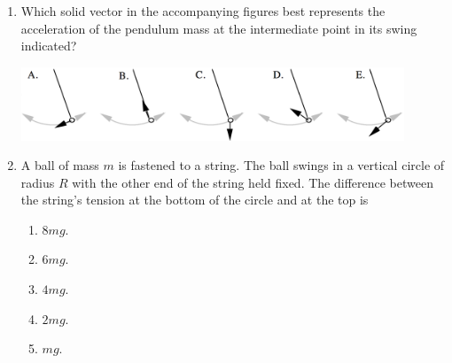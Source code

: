 \documentclass[12pt,letterpaper]{article}
\begin{document}
\begin{enumerate}[resume]
\item
Which solid vector in the accompanying figures best represents the acceleration of the pendulum mass at the intermediate point in its swing indicated?

\includegraphics[width=0.9\textwidth,center]{swing.png}


\item
A ball of mass $m$ is fastened to a string. The ball swings in a vertical circle of radius $R$ with the other end of the string held fixed. The difference between the string's tension at the bottom of the circle and at the top is
\begin{enumerate}
\item $8mg$.
\item $6mg$.
\item $4mg$.
\item $2mg$.
\item $mg$.
\end{enumerate}


\end{enumerate}
\end{document}
